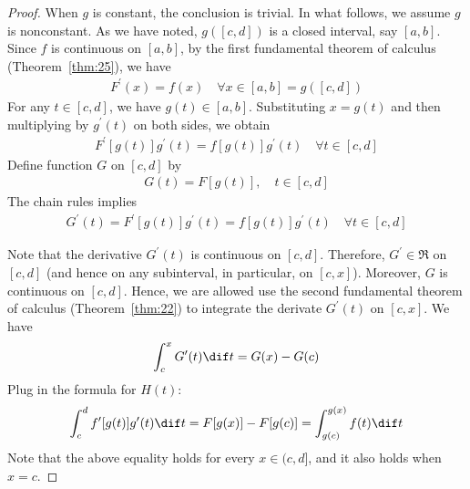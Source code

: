\documentclass[thmcnt=section, color=blue, 12pt]{my-elegantbook}
\begin{document}
\begin{proof}
	When $g$ is constant, the conclusion is trivial.
	In what follows, we assume $g$ is nonconstant.
	As we have noted, $g([c, d])$ is a closed interval, say $[a, b]$.
	Since $f$ is continuous on $[a, b]$,
	by the first fundamental theorem of calculus (Theorem~\ref{thm:25}),
	we have
	\begin{align*}
		F^\prime(x) = f(x) \quad \forall x \in [a, b] = g([c, d])
	\end{align*}
	For any $t \in [c, d]$, we have $g(t) \in [a, b]$.
	Substituting $x = g(t)$
	and then multiplying by $g^\prime(t)$ on both sides,
	we obtain
	\begin{align*}
		F^\prime[g(t)] g^\prime(t) = f[g(t)] g^\prime(t)
		\quad \forall t \in [c, d]
	\end{align*}
	Define function $G$ on $[c, d]$ by
	\begin{align*}
		G(t) = F[g(t)], \quad t \in [c, d]
	\end{align*}
	The chain rules implies
	\begin{align*}
		G^\prime(t)
		= F^\prime[g(t)] g^\prime(t)
		= f[g(t)] g^\prime(t)
		\quad \forall t \in [c, d]
	\end{align*}

	Note that the derivative $G^\prime(t)$ is continuous on $[c, d]$.
	Therefore, $G^\prime \in \mathfrak{R}$ on $[c, d]$
	(and hence on any subinterval, in particular, on $[c, x]$).
	Moreover, $G$ is continuous on $[c, d]$.
	Hence, we are allowed use the second fundamental theorem of calculus
	(Theorem~\ref{thm:22}) to integrate the derivate $G^\prime(t)$
	on $[c, x]$.
	We have
	\begin{align*}
		\int_c^x G^\prime(t) \dif t = G(x) - G(c)
	\end{align*}
	Plug in the formula for $H(t)$:
	\begin{align*}
		\int_c^d f^\prime[g(t)] g^\prime(t) \dif t = F[g(x)] - F[g(c)]
		= \int_{g(c)}^{g(x)} f(t) \dif t
	\end{align*}
	Note that the above equality holds for every $x \in (c, d]$,
	and it also holds when $x = c$.
\end{proof}
\end{document}
